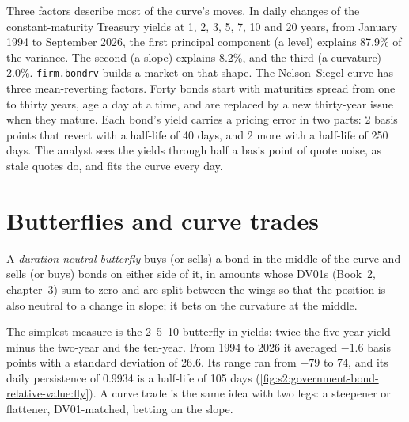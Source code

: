 Three factors describe most of the curve's moves. In daily changes of the constant-maturity Treasury yields at 1, 2, 3, 5, 7, 10 and 20 years, from
January 1994 to September 2026, the first principal component (a level) explains 87.9\% of the variance. The second (a slope) explains 8.2\%, and the
third (a curvature) 2.0\%. \texttt{firm.bondrv} builds a market on that shape. The Nelson--Siegel curve has three mean-reverting factors. Forty bonds
start with maturities spread from one to thirty years, age a day at a time, and are replaced by a new thirty-year issue when they mature. Each bond's
yield carries a pricing error in two parts: 2 basis points that revert with a half-life of 40 days, and 2 more with a half-life of 250 days. The
analyst sees the yields through half a basis point of quote noise, as stale quotes do, and fits the curve every day.

\section{Butterflies and curve trades}

\begin{definition}\label{def:s2:government-bond-relative-value:fly}
A \emph{duration-neutral butterfly} buys (or sells) a bond in the middle of the curve and sells (or buys) bonds on
either side of it, in amounts whose DV01s (Book~2, chapter~3) sum to zero and are split between the wings so that the position is also neutral to a
change in slope; it bets on the curvature at the middle.
\end{definition}

The simplest measure is the 2--5--10 butterfly in yields: twice the five-year yield minus the two-year and the ten-year. From 1994 to 2026 it averaged
$-1.6$ basis points with a standard deviation of 26.6. Its range ran from $-79$ to 74, and its daily persistence of 0.9934 is a half-life of 105 days
(\cref{fig:s2:government-bond-relative-value:fly}). A curve trade is the same idea with two legs: a steepener or flattener, DV01-matched, betting on the
slope.

\begin{omfigure}

\label{fig:s2:government-bond-relative-value:fly}
\end{omfigure}

